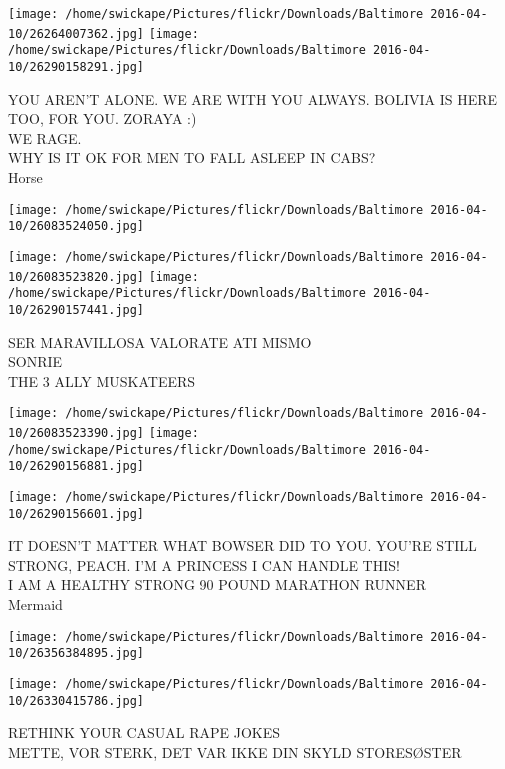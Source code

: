 \documentclass[10pt,letterpaper]{article}
\begin{document}
\texttt{[image: /home/swickape/Pictures/flickr/Downloads/Baltimore 2016-04-10/26264007362.jpg]}
\texttt{[image: /home/swickape/Pictures/flickr/Downloads/Baltimore 2016-04-10/26290158291.jpg]}

YOU AREN'T ALONE.  WE ARE WITH YOU ALWAYS.  BOLIVIA IS HERE TOO, FOR YOU.  ZORAYA :)\\
WE RAGE.\\
WHY IS IT OK FOR MEN TO FALL ASLEEP IN CABS?\\
Horse\\
\pagebreak

\texttt{[image: /home/swickape/Pictures/flickr/Downloads/Baltimore 2016-04-10/26083524050.jpg]}

\vspace{0.25in}
\texttt{[image: /home/swickape/Pictures/flickr/Downloads/Baltimore 2016-04-10/26083523820.jpg]}
\texttt{[image: /home/swickape/Pictures/flickr/Downloads/Baltimore 2016-04-10/26290157441.jpg]}

SER MARAVILLOSA VALORATE ATI MISMO\\
SONRIE\\
THE 3 ALLY MUSKATEERS\\
\pagebreak

\texttt{[image: /home/swickape/Pictures/flickr/Downloads/Baltimore 2016-04-10/26083523390.jpg]}
\texttt{[image: /home/swickape/Pictures/flickr/Downloads/Baltimore 2016-04-10/26290156881.jpg]}

\texttt{[image: /home/swickape/Pictures/flickr/Downloads/Baltimore 2016-04-10/26290156601.jpg]}

IT DOESN'T MATTER WHAT BOWSER DID TO YOU.  YOU'RE STILL STRONG, PEACH.  I'M A PRINCESS I CAN HANDLE THIS!\\
I AM A HEALTHY STRONG 90 POUND MARATHON RUNNER\\
Mermaid\\
\pagebreak

\texttt{[image: /home/swickape/Pictures/flickr/Downloads/Baltimore 2016-04-10/26356384895.jpg]}

\vspace{0.25in}
\texttt{[image: /home/swickape/Pictures/flickr/Downloads/Baltimore 2016-04-10/26330415786.jpg]}

RETHINK YOUR CASUAL RAPE JOKES\\
METTE, VOR STERK, DET VAR IKKE DIN SKYLD STORESØSTER\\
\pagebreak
\end{document}
